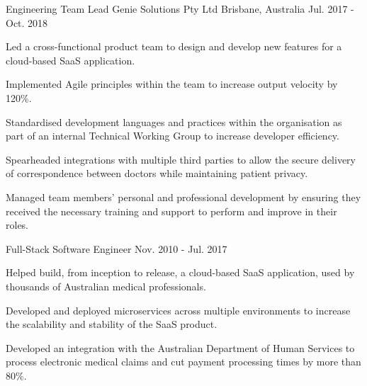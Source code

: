 \begin{cventries}
  \cventry
    {Engineering Team Lead} %
    {Genie Solutions Pty Ltd} %
    {Brisbane, Australia} %
    {Jul. 2017 - Oct. 2018} %
    {
      \begin{cvitems} %
        \item {
          Led a cross-functional product team to design and develop new features for a cloud-based SaaS application.
        }
        \item {
          Implemented Agile principles within the team to increase output velocity by 120\%.
        }
        \item {
          Standardised development languages and practices within the organisation as part of an internal Technical
          Working Group to increase developer efficiency.
        }
        \item {
          Spearheaded integrations with multiple third parties to allow the secure delivery of correspondence between
          doctors while maintaining patient privacy.
        }
        \item {
          Managed team members' personal and professional development by ensuring they received the necessary training
          and support to perform and improve in their roles.
        }
      \end{cvitems}
    }

  \cventry
    {Full-Stack Software Engineer} %
    {} %
    {} %
    {Nov. 2010 - Jul. 2017} %
    {
      \begin{cvitems} %
        \item {
          Helped build, from inception to release, a cloud-based SaaS application, used by thousands of Australian
          medical professionals.
        }
        \item {
          Developed and deployed microservices across multiple environments to increase the scalability and stability
          of the SaaS product.
        }
        \item {
          Developed an integration with the Australian Department of Human Services to process electronic medical
          claims and cut payment processing times by more than 80\%.
        }
      \end{cvitems}
    }


\end{cventries}
